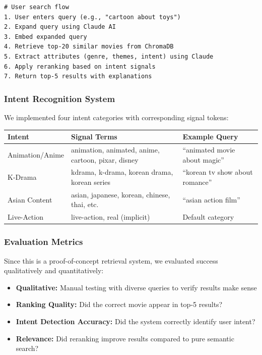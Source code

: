 \documentclass[11pt,a4paper]{article}
\begin{document}
\begin{lstlisting}
# User search flow
1. User enters query (e.g., "cartoon about toys")
2. Expand query using Claude AI
3. Embed expanded query
4. Retrieve top-20 similar movies from ChromaDB
5. Extract attributes (genre, themes, intent) using Claude
6. Apply reranking based on intent signals
7. Return top-5 results with explanations
\end{lstlisting}

\subsubsection{Intent Recognition System}

We implemented four intent categories with corresponding signal tokens:

\begin{table}[h]
\centering
\begin{tabularx}{\linewidth}{|l|X|l|}
\hline
\textbf{Intent} & \textbf{Signal Terms} & \textbf{Example Query} \\
\hline
Animation/Anime & animation, animated, anime, cartoon, pixar, disney & ``animated movie about magic'' \\
\hline
K-Drama & kdrama, k-drama, korean drama, korean series & ``korean tv show about romance'' \\
\hline
Asian Content & asian, japanese, korean, chinese, thai, etc. & ``asian action film'' \\
\hline
Live-Action & live-action, real (implicit) & Default category \\
\hline
\end{tabularx}
\end{table}

\subsubsection{Evaluation Metrics}

Since this is a proof-of-concept retrieval system, we evaluated success qualitatively and quantitatively:

\begin{itemize}
    \item \textbf{Qualitative:} Manual testing with diverse queries to verify results make sense
    \item \textbf{Ranking Quality:} Did the correct movie appear in top-5 results?
    \item \textbf{Intent Detection Accuracy:} Did the system correctly identify user intent?
    \item \textbf{Relevance:} Did reranking improve results compared to pure semantic search?
\end{itemize}
\end{document}
